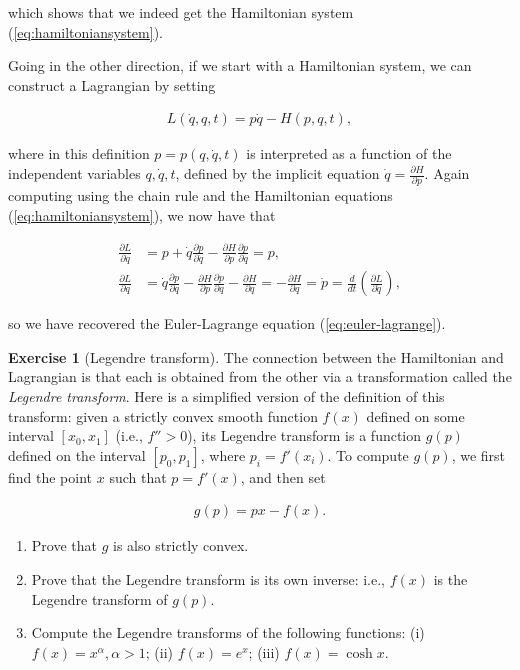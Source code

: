 \documentclass[11pt]{report}
\theoremstyle{plain}
\theoremstyle{definition}
\newtheorem{xexercise}[thm]{Exercise}
\begin{document}
which shows that we indeed get the Hamiltonian system
(\ref{eq:hamiltoniansystem}).

Going in the other direction, if we start with a
Hamiltonian system, we can construct a Lagrangian by
setting

\begin{equation*} \tag{6}\label{eq:lagrange-hamilton}
\begin{split}
L(\dot{q}, q, t) = p\dot{q} - H(p,q,t),
\end{split}
\end{equation*}

where in this definition $p=p(q,\dot{q},t)$ is
interpreted as a function of the independent variables
$q, \dot{q}, t$, defined by the implicit equation
$\dot{q} = \frac{\partial H}{\partial p}$. Again
computing using the chain rule and the Hamiltonian
equations (\ref{eq:hamiltoniansystem}), we now have that

\begin{align*}
\frac{\partial L}{\partial \dot{q}} &= p + \dot{q} \frac{\partial p}{\partial \dot{q}} - \frac{\partial H}{\partial p} \frac{\partial p}{\partial \dot{q}} = p, \\
\frac{\partial L}{\partial q} &= \dot{q}\frac{\partial p}{\partial q}-\frac{\partial H}{\partial p}\frac{\partial p}{\partial q}-\frac{\partial H}{\partial q}=-\frac{\partial H}{\partial q}=\dot{p} = \frac{d}{dt}
\left( \frac{\partial L}{\partial \dot{q}} \right),
\end{align*}

so we have recovered the Euler-Lagrange equation
(\ref{eq:euler-lagrange}).

\begin{xexercise}[Legendre transform]
The connection between the Hamiltonian and Lagrangian
is that each is obtained from the other via a
transformation called the \emph{Legendre transform}. Here
is a simplified version of the definition of this
transform: given a strictly convex smooth function
$f(x)$ defined on some interval $[x_0,x_1]$ (i.e.,
$f''>0$), its Legendre transform is a function $g(p)$
defined on the interval $[p_0,p_1]$, where
$p_i=f'(x_i)$. To compute $g(p)$, we first find the
point $x$ such that $p=f'(x)$, and then set

\begin{align*}
g(p) = px - f(x).
\end{align*}

\begin{enumerate}[label=\arabic*.]
\item Prove that $g$ is also strictly convex.

\item Prove that the Legendre transform is its own inverse:
i.e., $f(x)$ is the Legendre transform of $g(p)$.

\item Compute the Legendre transforms of the following
functions: (i) $f(x)=x^{\alpha}, \alpha>1$; (ii)
$f(x)=e^x$; (iii) $f(x)=\cosh x$.
\end{enumerate}

\end{xexercise}
\end{document}
